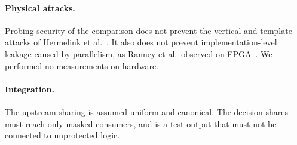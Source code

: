 \paragraph{Physical attacks.} Probing security of the comparison does not prevent the vertical and template attacks of Hermelink et al.~\cite{hermelink2024}. It also does not prevent implementation-level leakage caused by parallelism, as Ranney et al.\ observed on FPGA~\cite{ranney2026}. We performed no measurements on hardware.

\paragraph{Integration.} The upstream sharing is assumed uniform and canonical. The decision shares must reach only masked consumers, and  is a test output that must not be connected to unprotected logic.
